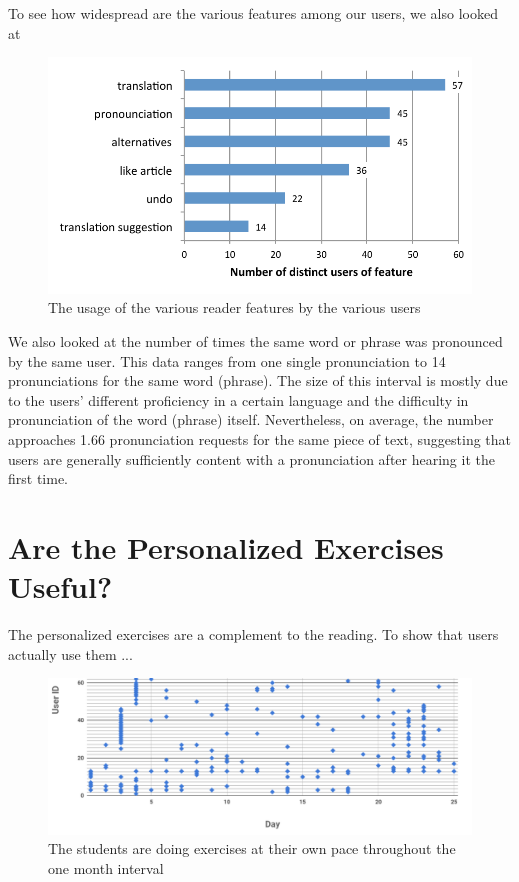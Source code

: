 To see how widespread are the various features among our users, we also looked at 


\begin{figure}[h!]
\centering
  \includegraphics[width=0.9\columnwidth]{figures/reader_feature_usage_per_user}
  \caption{The usage of the various reader features by the various users }
\end{figure}

We also looked at the number of times the same word or phrase was pronounced by the same user. This data ranges from one single pronunciation to 14 pronunciations for the same word (phrase). The size of this interval is mostly due to the users’ different proficiency in a certain language and the difficulty in pronunciation of the word (phrase) itself. Nevertheless, on average, the number approaches 1.66 pronunciation requests for the same
piece of text, suggesting that users are generally sufficiently content with a pronunciation after hearing it the first time.



\section{Are the Personalized Exercises Useful?}

The personalized exercises are a complement to the reading. To show that 
users actually use them ... 

\begin{figure}[h!]
\centering
  \includegraphics[width=\columnwidth]{figures/users_exercises}
  \caption{The students are doing exercises at their own pace throughout the one month interval }
\end{figure}

